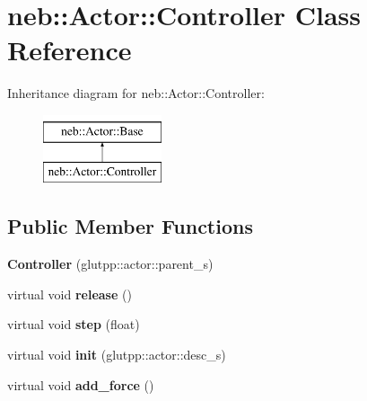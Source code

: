 \hypertarget{classneb_1_1Actor_1_1Controller}{\section{neb\-:\-:\-Actor\-:\-:\-Controller \-Class \-Reference}
\label{classneb_1_1Actor_1_1Controller}
}
\-Inheritance diagram for neb\-:\-:\-Actor\-:\-:\-Controller\-:\begin{figure}[H]
\begin{center}
\leavevmode
\includegraphics[height=2.000000cm]{classneb_1_1Actor_1_1Controller}
\end{center}
\end{figure}
\subsection*{\-Public \-Member \-Functions}
\begin{DoxyCompactItemize}
\item 
\hypertarget{classneb_1_1Actor_1_1Controller_aeedad5d671d8d4bc4398efd7be7fc005}{{\bfseries \-Controller} (glutpp\-::actor\-::parent\-\_\-s)}\label{classneb_1_1Actor_1_1Controller_aeedad5d671d8d4bc4398efd7be7fc005}

\item 
\hypertarget{classneb_1_1Actor_1_1Controller_ac6f5996da2aea174de794de4ffc647f4}{virtual void {\bfseries release} ()}\label{classneb_1_1Actor_1_1Controller_ac6f5996da2aea174de794de4ffc647f4}

\item 
\hypertarget{classneb_1_1Actor_1_1Controller_a95830d761987167e8ab122f3ca16346f}{virtual void {\bfseries step} (float)}\label{classneb_1_1Actor_1_1Controller_a95830d761987167e8ab122f3ca16346f}

\item 
\hypertarget{classneb_1_1Actor_1_1Controller_aad1420da60579f17c8dec8dad2a517bb}{virtual void {\bfseries init} (glutpp\-::actor\-::desc\-\_\-s)}\label{classneb_1_1Actor_1_1Controller_aad1420da60579f17c8dec8dad2a517bb}

\item 
\hypertarget{classneb_1_1Actor_1_1Controller_ab8ab78f513b014f112895de7dad43040}{virtual void {\bfseries add\-\_\-force} ()}\label{classneb_1_1Actor_1_1Controller_ab8ab78f513b014f112895de7dad43040}

\end{DoxyCompactItemize}
